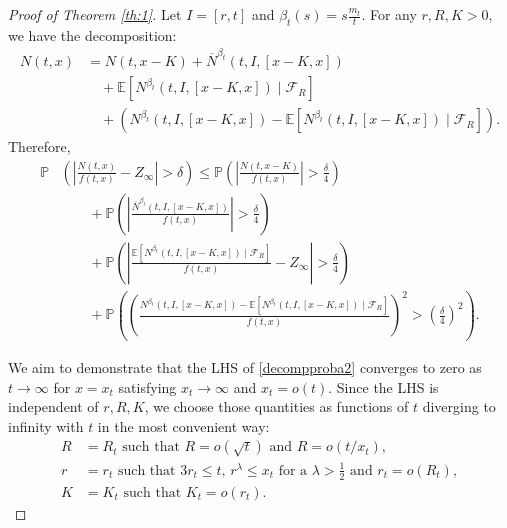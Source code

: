 \documentclass{article}
\newcommand{\NOB}[2]{\overline{N}^{#1}(#2)}
\newcommand{\E}[0]{\mathbb{E}}
\newcommand{\Prob}{\mathbb{P}}
\begin{document}
\begin{proof}[Proof of Theorem \ref{th:1}]
Let \( I = [r, t] \) and \( \beta_t(s) = s\frac{m_t}{t} \). For any \( r, R, K > 0 \), we have the decomposition:
\begin{equation}\label{decompproba}
\begin{split}
    N(t,x) &= N(t,x-K) + \NOB{\beta_t}{t, I,[x-K,x]} \\
    &\quad + \E\left[N^{\beta_t}\left(t,I,[x-K,x]\right) \mid \mathcal{F}_{R} \right] \\
    &\quad + \left(N^{\beta_t}(t, I,[x-K,x]) - \E\left[N^{\beta_t}(t, I,[x-K,x]) \mid \mathcal{F}_{R} \right]\right).
\end{split}
\end{equation}
Therefore,
\begin{equation}\label{decompproba2}
\begin{split}
    \Prob&\left(\left|\frac{N(t,x)}{f(t,x)} -Z_\infty \right|>\delta\right) \leq \Prob\left(\left|\frac{N(t,x-K)}{f(t,x)}\right|>\frac{\delta}{4}\right) 
    \\& \qquad+\Prob\left(\left|\frac{\NOB{\beta_t}{t, I,[x-K,x]} }{f(t,x)}\right|>\frac{\delta}{4}\right) 
    \\&\qquad+\Prob\left(\left|\frac{\E\left[N^{\beta_t}(t,I,[x-K,x])\mid \mathcal{F}_{R} \right]}{f(t,x)} -Z_\infty \right|>\frac{\delta}{4}\right)
    \\&\qquad+\Prob\left(\left(\frac{N^{\beta_t}(t, I,[x-K,x]) - \E\left[N^{\beta_t}(t, I,[x-K,x])\mid \mathcal{F}_{R} \right]}{f(t,x)}\right)^2>\left(\frac{\delta}{4}\right)^2 \right).
\end{split}
\end{equation}

We aim to demonstrate that the LHS of \eqref{decompproba2} converges to zero as $t\to \infty$ for $x=x_t$ satisfying $x_t\rightarrow \infty$ and $x_t=o(t)$. Since the LHS is independent of $r,R,K$, we choose those quantities as functions of $t$ diverging to infinity with $t$ in the most convenient way:  
\begin{align*}
    R&=R_t  \text{ such that } R=o(\sqrt{t}) \text{ and } R=o(t/x_t), \\
    r&=r_t \text{ such that } 3r_t\leq t, \, r^{\lambda}\leq x_t \text{ for a } \lambda>\frac{1}{2}\text{ and } r_t=o(R_t),\\
    K&=K_t \text{ such that } K_t=o(r_t).
\end{align*}


\end{proof}
\end{document}
